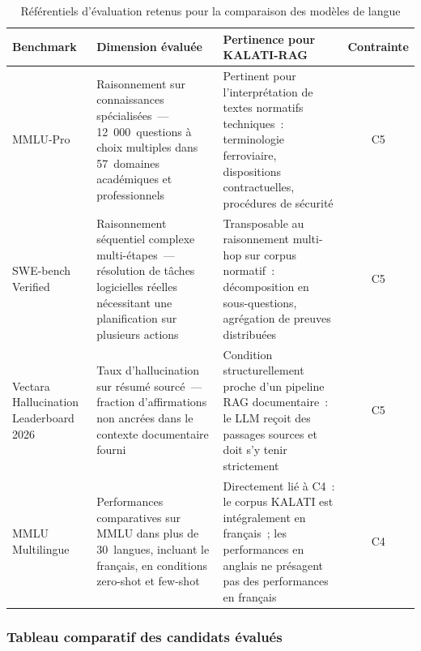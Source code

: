 \documentclass[12pt,a4paper]{report}
\begin{document}
\begin{table}
\centering
\caption{Référentiels d'évaluation retenus pour la comparaison des modèles de langue}
\label{tab:benchmarks-retenus}
\small
\renewcommand{\arraystretch}{1.2}
\begin{tabularx}{\textheight}{@{} l X X c @{}}
\toprule
\textbf{Benchmark} & \textbf{Dimension évaluée} & \textbf{Pertinence pour KALATI-RAG}
& \textbf{Contrainte} \\
\midrule
MMLU-Pro &
Raisonnement sur connaissances spécialisées~--- 12~000~questions à choix multiples dans
57~domaines académiques et professionnels &
Pertinent pour l'interprétation de textes normatifs techniques~: terminologie ferroviaire,
dispositions contractuelles, procédures de sécurité &
C5 \\
\addlinespace
SWE-bench Verified &
Raisonnement séquentiel complexe multi-étapes~--- résolution de tâches logicielles réelles
nécessitant une planification sur plusieurs actions &
Transposable au raisonnement multi-hop sur corpus normatif~: décomposition en sous-questions,
agrégation de preuves distribuées &
C5 \\
\addlinespace
Vectara Hallucination Leaderboard 2026 &
Taux d'hallucination sur résumé sourcé~--- fraction d'affirmations non ancrées dans le contexte
documentaire fourni &
Condition structurellement proche d'un pipeline RAG documentaire~: le LLM reçoit des passages
sources et doit s'y tenir strictement &
C5 \\
\addlinespace
MMLU Multilingue~\autocite{Thellmann2024} &
Performances comparatives sur MMLU dans plus de 30~langues, incluant le français, en conditions
zero-shot et few-shot &
Directement lié à C4~: le corpus KALATI est intégralement en français~; les performances en
anglais ne présagent pas des performances en français &
C4 \\
\bottomrule
\end{tabularx}
\end{table}

\subsubsection*{Tableau comparatif des candidats évalués}
\end{document}
